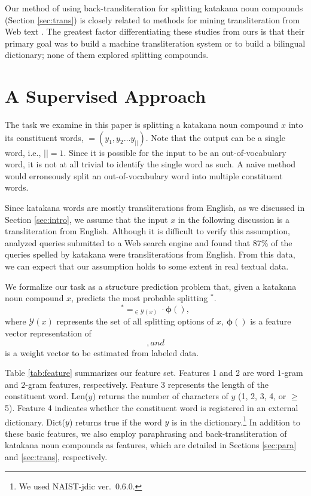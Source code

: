 \documentclass[english]{jnlp_1.4_rep}
\newcommand{\argmax}{}
\newcommand{\w}{}
\newcommand{\y}{}
\begin{document}
Our method of using back-transliteration for splitting katakana noun
compounds (Section \ref{sec:trans}) is closely related to methods for
mining transliteration from Web text
\cite{Brill01,Cao07,Oh08,Wu09}. The greatest factor differentiating
these studies from ours is that their primary goal was to build a
machine transliteration system or to build a bilingual dictionary; none
of them explored splitting compounds.

\section{A Supervised Approach} \label{sec:approach}

The task we examine in this paper is splitting a katakana noun compound
$x$ into its constituent words, $\y=(y_1,y_2\dots y_{|\y|})$. Note that
the output can be a single word, i.e., $|\y|=1$. Since it is possible
for the input to be an out-of-vocabulary word, it is not at all trivial
to identify the single word as such. A naive method would erroneously
split an out-of-vocabulary word into multiple constituent words.

Since katakana words are mostly transliterations from English, as we
discussed in Section \ref{sec:intro}, we assume that the input $x$ in
the following discussion is a transliteration from English. Although it
is difficult to verify this assumption,  analyzed
queries submitted to a Web search engine and found that 87\% of the
queries spelled by katakana were transliterations from English. From this
data, we can expect that our assumption holds to some extent in real
textual data.

We formalize our task as a structure prediction problem that, given
a katakana noun compound $x$, predicts the most probable splitting
$\y^{*}$.
\[
 \y^{*} = \argmax_{\y\in\mathcal{Y}(x)}\w\cdot{\bm\phi}(\y),
\]
where $\mathcal{Y}(x)$ represents the set of all splitting options of
$x$, ${\bm\phi}(\y)$ is a feature vector representation of $\y$, and
$\w$ is a weight vector to be estimated from labeled data.

Table \ref{tab:feature} summarizes our feature set. Features 1 and 2 are
word $1$-gram and $2$-gram features, respectively. Feature 3 represents
the length of the constituent word. {\sc Len}($y$) returns the number of
characters of $y$ (1, 2, 3, 4, or $\geq$5). Feature 4 indicates whether
the constituent word is registered in an external dictionary. {\sc
Dict}($y$) returns true if the word $y$ is in the dictionary.\footnote{
	We used NAIST-jdic ver.~0.6.0.} In addition to these basic
features, we also employ paraphrasing and back-transliteration of
katakana noun compounds as features, which are detailed in Sections
\ref{sec:para} and \ref{sec:trans}, respectively.
\end{document}

